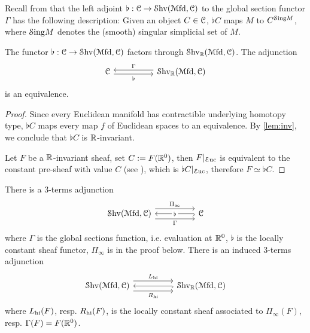\documentclass[10pt]{amsart}
\begin{document}
Recall from \cite{nanto2025diffcoh4} that the left adjoint $\flat:\mathcal{C}\to\mathcal{S}\mathrm{hv}(\mathcal{M}\mathrm{fd},\mathcal{C})$ to the global section functor $\Gamma$ has the following description: Given an object $C\in\mathcal{C}$, $\flat C$ maps $M$ to $C^{\mathcal{S}\mathrm{ing} M}$, where $\mathcal{S}\mathrm{ing} M$ denotes the (smooth) singular simplicial set of $M$.
\begin{corollary}\label{cor:equiv}
  The functor $\flat:\mathcal{C}\to\mathcal{S}\mathrm{hv}(\mathcal{M}\mathrm{fd},\mathcal{C})$ factors through $\mathcal{S}\mathrm{hv}_{\mathbb{R}}(\mathcal{M}\mathrm{fd},\mathcal{C})$. The adjunction \begin{equation}
    \begin{tikzcd}
      \lC \arrow[rr,shift right,"\flat"'] & & \Shv_\bR(\Mfd,\lC) \arrow[ll,shift right,"\Gamma"']
    \end{tikzcd}
  \end{equation}is an equivalence. 
\end{corollary}
\begin{proof}
  Since every Euclidean manifold has contractible underlying homotopy type, $\flat C$ maps every map $f$ of Euclidean spaces to an equivalence. By \cref{lem:inv}, we conclude that $\flat C$ is $\mathbb{R}$-invariant. 

  Let $F$ be a $\mathbb{R}$-invariant sheaf, set $C:=F(\mathbb{R}^0)$, then $F|_{\mathcal{E}\mathrm{uc}}$ is equivalent to the constant pre-sheaf with value $C$ (see \cite[Remark 2.7]{nanto2025diffcoh4}), which is $\flat C|_{\mathcal{E}\mathrm{uc}}$, therefore $F\simeq \flat C$.
\end{proof}
\begin{theorem}\label{thm:adj}
  There is a 3-terms adjunction 
  \begin{equation}\label{eq:adjunction}
    \begin{tikzcd}
      \Shv(\Mfd,\lC) \arrow[rr,shift left=2.5,"\Pi_\infty"] \arrow[rr,shift right=2.5,"\Gamma"'] & & \lC \arrow[ll,hook,"\flat" description]
    \end{tikzcd}
  \end{equation}
  where $\Gamma$ is the global sections function, i.e. evaluation at $\mathbb{R}^0$, $\flat$ is the locally constant sheaf functor, $\Pi_\infty$ is in the proof below. There is an induced 3-terms adjunction \begin{equation}
    \begin{tikzcd}
      \Shv(\Mfd,\lC) \arrow[rr,shift left=2.5,"L_\hi"] \arrow[rr,shift right=2.5,"R_\hi"'] & & \Shv_\bR(\Mfd,\lC) \arrow[ll,hook]
    \end{tikzcd}
  \end{equation}where $L_{\mathrm{hi}}(F)$, resp. $R_{\mathrm{hi}}(F)$, is the locally constant sheaf associated to $\Pi_\infty(F)$, resp. $\Gamma(F)=F(\mathbb{R}^0)$. 
\end{theorem}
\end{document}
